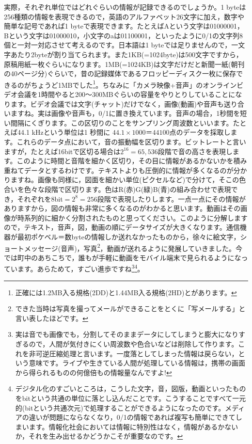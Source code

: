 \documentclass{ltjsbook}
\begin{document}
実際，それぞれ単位ではどれぐらいの情報が記録できるのでしょうか。1 byteは256種類の情報を表現できるので，英語のアルファベット26文字に加え，数字や簡単な記号であれば1 byteで表現できます。たとえばAという文字は01000001，Bという文字は01000010，小文字のaは01100001，といったように0/1の文字列8個と一対一対応させて考えるのです。日本語は1 byteでは足りませんので，一文字あたり2byteが割り当てられます。また1KB(=1024byte)は500文字ですから，原稿用紙一枚ぐらいになります。1MB(=1024KB)は文字だけだと新聞一紙(朝刊の40ページ分)ぐらいで，昔の記録媒体であるフロッピーディスク一枚に保存できるのがちょうど1MBでした\footnote{正確には1.2MB入る規格(2DD)と1.44MB入る規格(2HD)とがあります。}。ちなみに「カメラ映像+音声」のオンラインビデオ会議を1時間やると200〜300MBぐらいの容量をやりとりしていることになります。ビデオ会議では文字(チャット)だけでなく，画像(動画)や音声も送り合いますね。実は画像や音声も，0/1に置き換えています。音声の場合，1秒間を短い間隔にくぎります。この区切りのことをサンプリング周波数といいます。たとえば44.1 kHzという単位は1 秒間に $44.1 \times 1000 ＝ 44100$点のデータを採取します。これらのデータ点において，音の振動幅を区切ります。ビットレートと言いますが，たとえば16bitで区切る場合は$2^{16}=65,536$段階で音の高さを表現します。このように時間と音階を細かく区切り，その目に情報があるかないかを積み重ねてデータとするわけです。テキストよりも圧倒的に情報が多くなるのが分かりますね。画像も同様に，図面を細かい単位(ピクセルなど)で分けて，そこの色合いを色々な段階で区切ります。色はR(赤)G(緑)B(青)の組み合わせで表現でき，それぞれを8bit$=2^8=256$段階で表現したりします。一点一点にその情報がありますから，図の情報も非常に多くなるのがわかると思います。動画はその画像が時系列的に細かく分割されたものと思ってください。このように分解しますので，テキスト，音声，図，動画の順にデータサイズが大きくなります。通信機器が最初ポケベル＝数byteの情報しか送れなかったものから，徐々に絵文字，ショートメッセージ(音声)，写真\footnote{できた当時は写真を撮ってメールができることをとくに「写メールする」と言い表したほどです。}，動画が送れるように発展していきました。今では町中のあちこちで，誰もが手軽に動画をモバイル端末で見られるようになっています。あらためて，すごい進歩ですね\footnote{実は音でも画像でも，分割してそのままデータにしてしまうと膨大になりすぎるので，人間が気付きにくい周波数や色合いなどは削除して作ります。これを非可逆圧縮処理と言います。一度落としてしまった情報は戻らない，という意味です。ライブや生きている人間が処理している情報は，携帯の画面から得られるものの何億倍もの情報量なんですよ!}\footnote{デジタル化のすごいところは，こうした文字，音，図版，動画といったものをbitという共通の単位に落とし込んだことです。こうすることですべて一元的(bitという共通次元)で処理することができるようになったのです。メディアの違いが問題にならなくなり，0/1の情報であれば複写も簡単にできてしまいます。情報化社会においては情報に特別性はなく，情報があるかないか，それを生み出せるかどうかこそが重要なのです。}。
\end{document}
